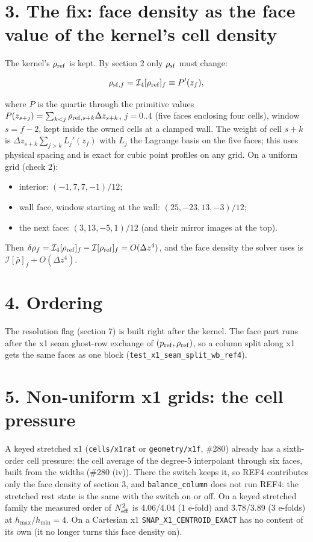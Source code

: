 \documentclass[11pt,a4paper]{article}
\begin{document}
\section*{3. The fix: face density as the face value of the kernel's cell density}

The kernel's $\rho_{\rm ref}$ is kept. By section 2 only $\rho_{\rm sf}$ must change:

\begin{equation*}
\rho_{{\rm sf},f} = \mathcal I_4[\rho_{\rm ref}]_f \equiv P'(z_f),
\end{equation*}

where $P$ is the quartic through the primitive values $P(z_{s+j}) = \sum_{k<j}\rho_{{\rm ref},s+k}\Delta z_{s+k}$,
$j = 0..4$ (five faces enclosing four cells), window $s = f - 2$, kept inside the owned cells at a clamped
wall. The weight of cell $s+k$ is $\Delta z_{s+k}\sum_{j>k}L_j'(z_f)$ with $L_j$ the Lagrange basis on the five
faces; this uses physical spacing and is exact for cubic point profiles on any grid. On a uniform grid
(check 2):

\begin{itemize}
\item interior: $(-1, 7, 7, -1)/12$;
\item wall face, window starting at the wall: $(25, -23, 13, -3)/12$;
\item the next face: $(3, 13, -5, 1)/12$ (and their mirror images at the top).
\end{itemize}

Then $\delta\rho_f = \mathcal I_4[\rho_{\rm ref}]_f - \mathcal I[\rho_{\rm ref}]_f = O(\Delta z^4)$, and the face
density the solver uses is $\mathcal I[\bar\rho]_f + O(\Delta z^4)$.

\section*{4. Ordering}

The resolution flag (section 7) is built right after the kernel. The face part runs after the x1 seam
ghost-row exchange of $(p_{\rm ref}, \rho_{\rm ref})$, so a column split along x1 gets the same faces as one
block (\texttt{test\_x1\_seam\_split\_wb\_ref4}).

\section*{5. Non-uniform x1 grids: the cell pressure}

A keyed stretched x1 (\texttt{cells/x1rat} or \texttt{geometry/x1f}, \#280) already has a
sixth-order cell pressure: the cell average of the degree-5 interpolant through six faces, built from the
widths (\#280 (iv)). There the switch keeps it, so REF4 contributes only the face density of section 3,
and \texttt{balance\_column} does not run REF4: the stretched rest state is the
same with the switch on or off. On a keyed
stretched family the measured order of $N^2_{\rm eff}$ is 4.06/4.04 (1 e-fold) and 3.78/3.89 (3 e-folds) at
$h_{\max}/h_{\min} = 4$. On a Cartesian x1 \texttt{SNAP\_X1\_CENTROID\_EXACT} has no content of its own (it no longer turns this face
density on).
\end{document}
